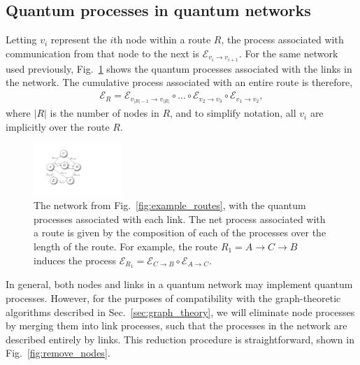 %
%

\subsection{Quantum processes in quantum networks} \label{sec:quant_proc_in} 

Letting $v_i$ represent the $i$th node within a route $R$, the process associated with communication from that node to the next is $\mathcal{E}_{v_i\to v_{i+1}}$. For the same network used previously, Fig.~\ref{fig:example_proc_graph} shows the quantum processes associated with the links in the network. The cumulative process associated with an entire route is therefore,
\begin{align}
\mathcal{E}_R = \mathcal{E}_{{v_{|R|-1}}\to v_{|R|}} \circ \dots \circ \mathcal{E}_{v_2\to v_3} \circ \mathcal{E}_{v_1\to v_2},
\end{align}
where $|R|$ is the number of nodes in $R$, and to simplify notation, all $v_i$ are implicitly over the route $R$.

\begin{figure}[!htbp]
\includegraphics[clip=true, width=0.3\textwidth]{example_graph}
\captionspacefig \caption{The network from Fig.~\ref{fig:example_routes}, with the quantum processes associated with each link. The net process associated with a route is given by the composition of each of the processes over the length of the route. For example, the route \mbox{$R_1=A\to C\to B$} induces the process \mbox{$\mathcal{E}_{R_1} = \mathcal{E}_{C\to B} \circ \mathcal{E}_{A\to C}$}.} \label{fig:example_proc_graph}
\end{figure}

In general, both nodes and links in a quantum network may implement quantum processes. However, for the purposes of compatibility with the graph-theoretic algorithms described in Sec.~\ref{sec:graph_theory}, we will eliminate node processes by merging them into link processes, such that the processes in the network are described entirely by links. This reduction procedure is straightforward, shown in Fig.~\ref{fig:remove_nodes}.

